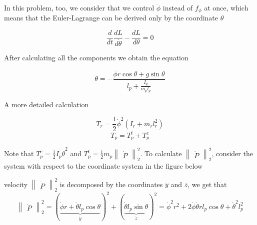 \documentclass[unicode]{article}
\begin{document}
In this problem, too, we consider that we control \(\ddot{\phi}\) instead of \(f_{\phi}\) at once, which means that the Euler-Lagrange can be derived only by the coordinate \(\theta\)

\[
    \frac{d}{dt} \frac{dL}{d\dot{\theta}} - \frac{dL}{d\theta} = 0
\]

After calculating all the components we obtain the equation

\[
    \ddot{\theta} = - \frac{\ddot{\phi} r \cos \theta + g\sin \theta}{l_p + \frac{I_p}{m_p l_p}}
\]

A more detailed calculation

\[
    T_r = \frac{1}{2}\dot{\phi}^2(I_r + m_rl_r^2)
\]
\[
    T_p = T_p^t + T_p^c
\]

Note that \(T_p^c = \frac{1}{2}I_p\dot{\theta}^2\) and \(T_p^t = \frac{1}{2}m_p\begin{Vmatrix} \dot{P} \end{Vmatrix}_2^2\). To calculate \(\begin{Vmatrix} \dot{P} \end{Vmatrix}_2^2\), consider the system with respect to the coordinate system in the figure below
\begin{center}
    
\end{center}
velocity \(\begin{Vmatrix} \dot{P} \end{Vmatrix}_2^2\) is decomposed by the coordinates \(y\) and \(z\), we get that
\[
    \begin{Vmatrix} \dot{P} \end{Vmatrix}_2^2 = \left(\underbrace{\dot{\phi} r + \dot{\theta} l_p \cos \theta }_{\dot{y}}\right)^2 + \left(\underbrace{\dot{\theta} l_p \sin \theta}_{\dot{z}} \right)^2 = \dot{\phi}^2 r^2 + 2 \dot{\phi} \dot{\theta} r l_p \cos \theta + \dot{\theta}^2 l_p^2
\]
\end{document}
